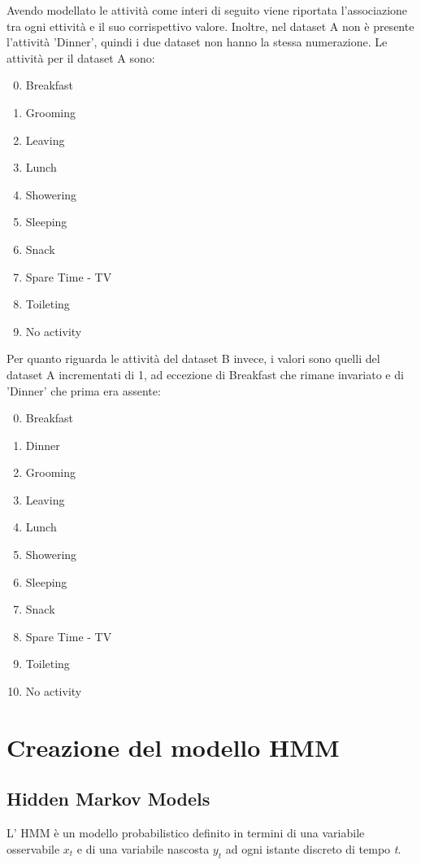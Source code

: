 \documentclass[10pt,a4paper]{article}
\begin{document}
	Avendo modellato le attività come interi di seguito viene riportata l'associazione tra ogni ettività e il suo corrispettivo valore. Inoltre, nel dataset A non è presente l'attività 'Dinner', quindi i due dataset non hanno la stessa numerazione.
	Le attività per il dataset A sono:
	\begin{enumerate}
	\setcounter{enumi}{-1}
	    \item Breakfast
	    \item Grooming
	    \item Leaving
	    \item Lunch
	    \item Showering
	    \item Sleeping
	    \item Snack
	    \item Spare Time - TV
	    \item Toileting
	    \item No activity
	\end{enumerate}

	Per quanto riguarda le attività del dataset B invece, i valori sono quelli del dataset A incrementati di 1, ad eccezione di Breakfast che rimane invariato e di 'Dinner' che prima era assente:
	\begin{enumerate}
	\setcounter{enumi}{-1}
	    \item Breakfast
	    \item Dinner
	    \item Grooming
	    \item Leaving
	    \item Lunch
	    \item Showering
	    \item Sleeping
	    \item Snack
	    \item Spare Time - TV
	    \item Toileting
	    \item No activity
	\end{enumerate}
	
	\section{Creazione del modello HMM}
	
	\subsection{Hidden Markov Models}
	L' HMM è un modello probabilistico definito in termini di una variabile osservabile $ x_{t} $ e di una variabile nascosta $ y_{t} $ ad ogni istante discreto di tempo \textit{t}.
	
\end{document}

